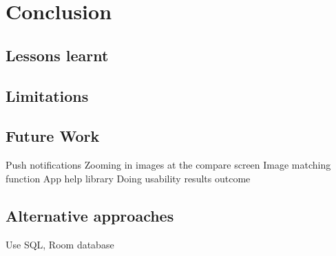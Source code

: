 \chapter{Conclusion}


\section{Lessons learnt}


\section{Limitations}


\section{Future Work}
Push notifications
Zooming in images at the compare screen
Image matching function
App help library
Doing usability results outcome

\section{Alternative approaches}
Use SQL, Room database

